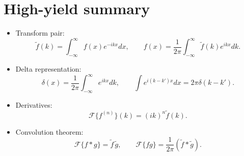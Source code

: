 
\section{High-yield summary}

\begin{itemize}
\item Transform pair:
\[
\tilde f(k)=\int_{-\infty}^{\infty}f(x)e^{-ikx}dx,\qquad
f(x)=\frac{1}{2\pi}\int_{-\infty}^{\infty}\tilde f(k)e^{ikx}dk.
\]
\item Delta representation:
\[
\delta(x)=\frac{1}{2\pi}\int_{-\infty}^{\infty}e^{ikx}dk,
\qquad
\int e^{i(k-k')x}dx=2\pi\delta(k-k').
\]
\item Derivatives:
\[
\mathcal{F}\{f^{(n)}\}(k)=(ik)^n\tilde f(k).
\]
\item Convolution theorem:
\[
\mathcal{F}\{f*g\}=\tilde f\,\tilde g,\qquad
\mathcal{F}\{fg\}=\frac{1}{2\pi}(\tilde f*\tilde g).
\]
\end{itemize}

